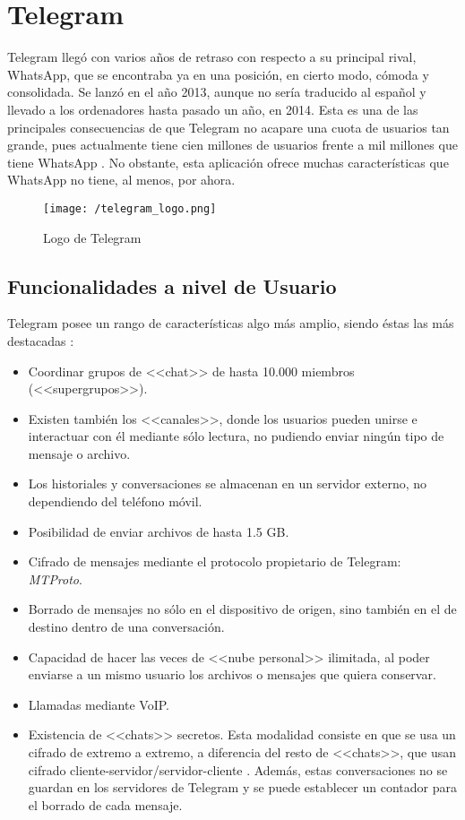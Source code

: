 
\section{Telegram}
\label{sec:telegram}

Telegram llegó con varios años de retraso con respecto a su principal rival, WhatsApp, que se encontraba ya en una posición, en cierto modo, cómoda y consolidada. Se lanzó en el año 2013, aunque no sería traducido al español y llevado a los ordenadores hasta pasado un año, en 2014. Esta es una de las principales consecuencias de que Telegram no acapare una cuota de usuarios tan grande, pues actualmente tiene cien millones de usuarios frente a mil millones que tiene WhatsApp \cite{Ramirez2017}. No obstante, esta aplicación ofrece muchas características que WhatsApp no tiene, al menos, por ahora.

\begin{figure}[!h]
	\begin{center}
		\texttt{[image: /telegram\_logo.png]}
		\caption{Logo de Telegram}
		\label{fig:telegram}
	\end{center}
\end{figure}

\subsection{Funcionalidades a nivel de Usuario}
Telegram posee un rango de características algo más amplio, siendo éstas las más destacadas \cite{Telegram2017}:

\begin{itemize}
	\item Coordinar grupos de <<chat>> de hasta 10.000 miembros (<<supergrupos>>).
	\item Existen también los <<canales>>, donde los usuarios pueden unirse e interactuar con él mediante sólo lectura, no pudiendo enviar ningún tipo de mensaje o archivo.
	\item Los historiales y conversaciones se almacenan en un servidor externo, no dependiendo del teléfono móvil.
	\item Posibilidad de enviar archivos de hasta 1.5 \acf{GB}.
	\item Cifrado de mensajes mediante el protocolo propietario de Telegram: \textit{MTProto}.
	\item Borrado de mensajes no sólo en el dispositivo de origen, sino también en el de destino dentro de una conversación.
	\item Capacidad de hacer las veces de <<nube personal>> ilimitada, al poder enviarse a un mismo usuario los archivos o mensajes que quiera conservar.
	\item Llamadas mediante \acs{VoIP}.
	\item Existencia de <<chats>> secretos. Esta modalidad consiste en que se usa un cifrado de extremo a extremo, a diferencia del resto de <<chats>>, que usan cifrado cliente-servidor/servidor-cliente \cite{Telegram2017a}. Además, estas conversaciones no se guardan en los servidores de Telegram y se puede establecer un contador para el borrado de cada mensaje.
\end{itemize}

